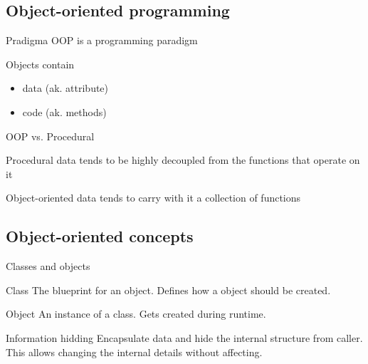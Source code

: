 \documentclass{beamer}
\begin{document}
\subsection{Object-oriented programming}

\begin{frame}{Pradigma}
OOP is a programming paradigm
\begin{block}{Objects contain}
\begin{itemize}
\item data (ak. attribute)
\item code (ak. methods)
\end{itemize}
\end{block}
\end{frame}

\begin{frame}{OOP vs. Procedural}

\begin{block}{Procedural}
data tends to be highly decoupled from the functions that operate on it
\end{block}

\begin{block}{Object-oriented}
data tends to carry with it a collection of functions
\end{block}


\end{frame}

\subsection{Object-oriented concepts}

\begin{frame}{Classes and objects}

\begin{block}{Class}
The blueprint for an object. Defines how a object should be created.
\end{block}

\begin{block}{Object}
An instance of a class. Gets created during runtime.
\end{block}

\end{frame}

\begin{frame}{Information hidding}
Encapsulate data and hide the internal structure from caller. This allows
changing the internal details without affecting.
\end{frame}
\end{document}
